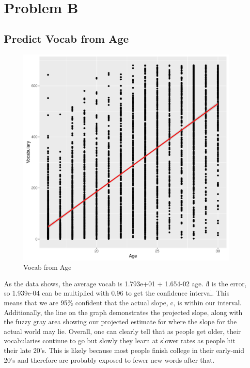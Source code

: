 \documentclass{article}
\begin{document}
    
  \section*{Problem B}
    \subsection*{Predict Vocab from Age}
      \begin{figure}[H]
        \includegraphics[width=\linewidth]{vocab_from_age.pdf}
        \caption{Vocab from Age}
        \label{fig:regression1}
      \end{figure}
      As the data shows, the average vocab is 1.793e+01 + 1.654-02 age. 
      \^{d} is the error, so 1.939e-04 can be multiplied with 0.96 to get the confidence
      interval. This means that we are 95\% confident that the actual slope, c, is
      within our interval. \newline Additionally, the line on the graph demonstrates the 
      projected slope, along with the fuzzy gray area showing our projected estimate
      for where the slope for the actual world may lie. Overall, one can clearly
      tell that as people get older, their vocabularies continue to go but slowly
      they learn at slower rates as people hit their late 20's. This is likely
      because most people finish college in their early-mid 20's and therefore
      are probably exposed to fewer new words after that. 
      
\end{document}
